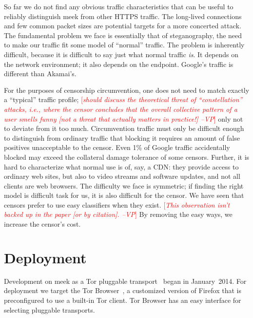 \documentclass{sig-alternate}
\newcommand{\meek}{meek\xspace}
\newcommand{\note}[1]{{\textcolor{red}{[\textit{#1}]}}}
\newcommand{\vp}[1]{\note{#1 --VP}}
\begin{document}

So far we do not find any obvious traffic characteristics that can be useful to reliably distinguish \meek
from other HTTPS traffic.
The long-lived connections and few common packet sizes are
potential targets for a more concerted attack.
The fundamental problem we face is essentially that of steganography,
the need to make our traffic fit some model of ``normal'' traffic.
The problem is inherently difficult,
because it is difficult to say just what normal traffic \emph{is}.
It depends on the network environment;
it also depends on the endpoint.
Google's traffic is different than Akamai's.

For the purposes of censorship circumvention,
one does not need to match exactly a ``typical'' traffic profile;
\vp{should discuss the theoretical threat of ``constellation'' attacks,
i.e., where the censor concludes that the overall collective pattern
of a user smells funny [not a threat that actually matters in practice!]}
only not to deviate from it too much.
Circumvention traffic must only be difficult enough to distinguish from ordinary traffic
that blocking it requires an amount of false positives unacceptable to the censor.
Even 1\% of Google traffic accidentally blocked may exceed the collateral damage tolerance of some censors.
Further, it is hard to characterize what normal use is of, say, a CDN:
they provide access to ordinary web sites,
but also to video streams and software updates,
and not all clients are web browsers.
The difficulty we face is symmetric;
if finding the right model is difficult task for us,
it is also difficult for the censor.
We have seen that censors prefer to use easy classifiers when they exist.
\vp{This observation isn't backed up in the paper [or by citation].}
By removing the easy ways, we increase the censor's cost.

\section{Deployment}
\label{sec:deployment}

Development on \meek as a Tor pluggable transport~\cite{pt} began in January~2014.
For deployment we target
the Tor Browser~\cite{torbrowser},
a customized version of Firefox that is
preconfigured to use a built-in Tor client.
Tor Browser has an easy interface for selecting pluggable transports.
\end{document}
